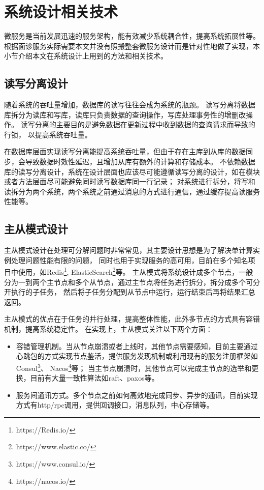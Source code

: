 \section{系统设计相关技术}
微服务是当前发展迅速的服务架构\cite{jamshidi2018microservices}，能有效减少系统耦合性，提高系统拓展性等。
根据面诊服务实际需要本文并没有照搬整套微服务设计而是针对性地做了实现，本小节介绍本文在系统设计上用到的方法和相关技术。

\subsection{读写分离设计}
随着系统的吞吐量增加，数据库的读写往往会成为系统的瓶颈。
读写分离将数据库拆分为读库和写库，读库只负责数据的查询操作，写库处理事务性的增删改操作。
读写分离的主要目的是避免数据在更新过程中收到数据的查询请求而导致的行锁，
以提高系统吞吐量。

在数据库层面实现读写分离能提高系统吞吐量，但由于存在主库到从库的数据同步，会导致数据时效性延迟，且增加从库有额外的计算和存储成本。
不依赖数据库的读写分离设计，系统在设计层面也应该尽可能遵循读写分离的设计，如在模块或者方法层面尽可能避免同时读写数据库同一行记录；
对系统进行拆分，将写和读拆分为两个系统，两个系统之前通过消息的方式进行通信，通过缓存提高读服务性能等。

\subsection{主从模式设计}
主从模式设计在处理可分解问题时非常常见，其主要设计思想是为了解决单计算实例处理问题性能有限的问题，
同时也用于实现服务的高可用，目前在多个知名项目中使用，如Redis\footnote{https://Redis.io/}, ElasticSearch\footnote{https://www.elastic.co/}等。
主从模式将系统设计成多个节点，一般分为一到两个主节点和多个从节点，通过主节点将任务进行拆分，拆分成多个可分开执行的子任务，
然后将子任务分配到从节点中运行，运行结束后再将结果汇总返回。

主从模式的优点在于任务的并行处理，提高整体性能，此外多节点的方式具有容错机制，提高系统稳定性。
在实现上，主从模式关注以下两个方面：
\begin{itemize}
    \item 容错管理机制。当从节点崩溃或者上线时，其他节点需要感知，目前主要通过心跳包的方式实现节点鉴活，提供服务发现机制或利用现有的服务注册框架如Consul\footnote{https://www.consul.io/}、 Nacos\footnote{https://nacos.io/}等；
    当主节点崩溃时，其他节点可以完成主节点的选举和更换，目前有大量一致性算法如raft、paxos等。
    \item 服务间通讯方式。多个节点之前如何高效地完成同步、异步的通讯，目前实现方式有http/rpc调用，提供回调接口，消息队列，中心存储等。
\end{itemize}

